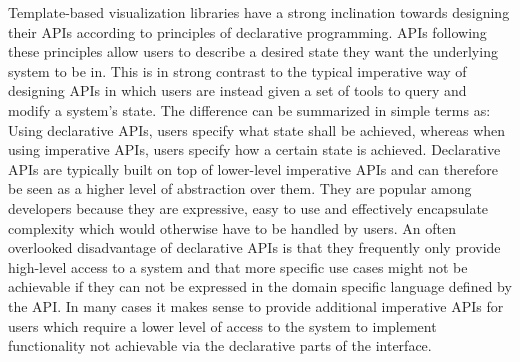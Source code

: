 Template-based visualization libraries have a strong inclination
towards designing their APIs according to principles of declarative
programming.  APIs following these principles allow users to describe
a desired state they want the underlying system to be in.  This is in
strong contrast to the typical imperative way of designing APIs in
which users are instead given a set of tools to query and modify a
system's state.  The difference can be summarized in simple terms as:
Using declarative APIs, users specify what state shall be achieved,
whereas when using imperative APIs, users specify how a certain state
is achieved.  Declarative APIs are typically built on top of
lower-level imperative APIs and can therefore be seen as a higher
level of abstraction over them.  They are popular among developers
because they are expressive, easy to use and effectively encapsulate
complexity which would otherwise have to be handled by users.  An
often overlooked disadvantage of declarative APIs is that they
frequently only provide high-level access to a system and that more
specific use cases might not be achievable if they can not be
expressed in the domain specific language defined by the API.  In many
cases it makes sense to provide additional imperative APIs for users
which require a lower level of access to the system to implement
functionality not achievable via the declarative parts of the
interface.

